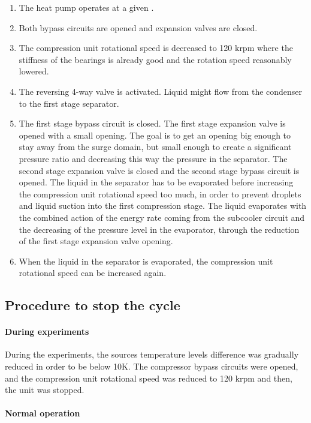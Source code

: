 \begin{enumerate}
\item The heat pump operates at a given \OP{}.
\item Both bypass circuits are opened and expansion valves are closed.
\item The compression unit rotational speed is decreased to 120 krpm
  where the stiffness of the bearings is already good and the rotation
  speed reasonably lowered.
\item The reversing 4-way valve is activated. Liquid might flow from
  the condenser to the first stage separator.
\item The first stage bypass circuit is closed. The first stage
  expansion valve is opened with a small opening. The goal is to get
  an opening big enough to stay away from the surge domain, but small
  enough to create a significant pressure ratio and decreasing this
  way the pressure in the separator. The second stage expansion valve
  is closed and the second stage bypass circuit is opened. The liquid
  in the separator has to be evaporated before increasing the
  compression unit rotational speed too much, in order to prevent
  droplets and liquid suction into the first compression stage. The
  liquid evaporates with the combined action of the energy rate coming
  from the subcooler circuit and the decreasing of the pressure level
  in the evaporator, through the reduction of the first stage
  expansion valve opening.
\item When the liquid in the separator is evaporated, the compression
  unit rotational speed can be increased again.
\end{enumerate}

\subsection{Procedure to stop the cycle}
\label{sec:awp-proc-stop}

\paragraph{During experiments}

During the experiments, the sources temperature levels difference was
gradually reduced in order to be below \num{10}\si{\kelvin}. The
compressor bypass circuits were opened, and the compression unit
rotational speed was reduced to 120 krpm and then, the unit was
stopped.

\paragraph{Normal operation}

